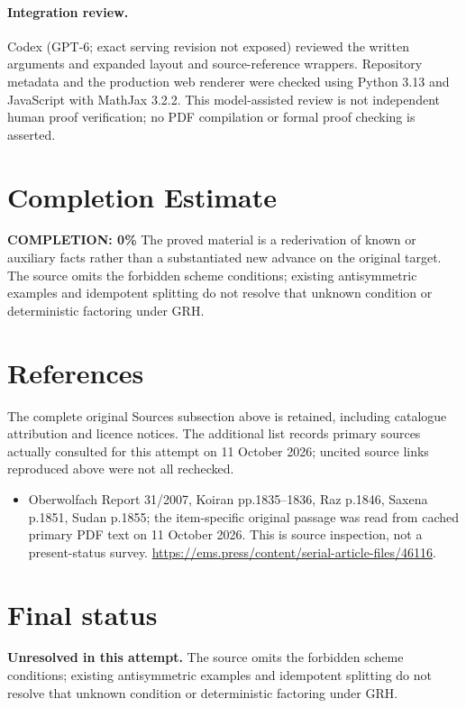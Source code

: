 \documentclass[11pt]{article}
\begin{document}
\paragraph{Integration review.} Codex (GPT-6; exact serving revision not exposed) reviewed the written arguments and expanded layout and source-reference wrappers. Repository metadata and the production web renderer were checked using Python 3.13 and JavaScript with MathJax 3.2.2. This model-assisted review is not independent human proof verification; no PDF compilation or formal proof checking is asserted.

\section{Completion Estimate}
\noindent\textbf{COMPLETION: 0\%}
The proved material is a rederivation of known or auxiliary facts rather than a substantiated new advance on the original target. The source omits the forbidden scheme conditions; existing antisymmetric examples and idempotent splitting do not resolve that unknown condition or deterministic factoring under GRH.
\section{References}
The complete original Sources subsection above is retained, including catalogue attribution and licence notices. The additional list records primary sources actually consulted for this attempt on 11 October 2026; uncited source links reproduced above were not all rechecked.
\begin{itemize}
\item Oberwolfach Report 31/2007, Koiran pp.1835--1836, Raz p.1846, Saxena p.1851, Sudan p.1855; the item-specific original passage was read from cached primary PDF text on 11 October 2026. This is source inspection, not a present-status survey. \url{https://ems.press/content/serial-article-files/46116}.
\end{itemize}
\section{Final status}
\textbf{Unresolved in this attempt.} The source omits the forbidden scheme conditions; existing antisymmetric examples and idempotent splitting do not resolve that unknown condition or deterministic factoring under GRH.
\end{document}

